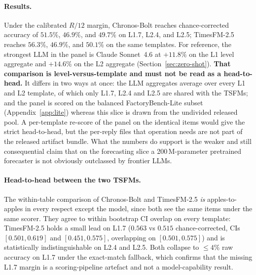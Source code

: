\paragraph{Results.} Under the calibrated $R/12$ margin, Chronos-Bolt reaches chance-corrected accuracy of $51.5\%$, $46.9\%$, and $49.7\%$ on L1.7, L2.4, and L2.5; TimesFM-2.5 reaches $56.3\%$, $46.9\%$, and $50.1\%$ on the same templates. For reference, the strongest LLM in the panel is Claude Sonnet~4.6 at $+11.8\%$ on the L1 level aggregate and $+14.6\%$ on the L2 aggregate (Section~\ref{sec:zero-shot}). \textbf{That comparison is level-versus-template and must not be read as a head-to-head.} It differs in two ways at once: the LLM aggregates average over every L1 and L2 template, of which only L1.7, L2.4 and L2.5 are shared with the TSFMs; and the panel is scored on the balanced FactoryBench-Lite subset (Appendix~\ref{app:lite}) whereas this slice is drawn from the undivided released pool. A per-template re-score of the panel on the identical items would give the strict head-to-head, but the per-reply files that operation needs are not part of the released artifact bundle. What the numbers do support is the weaker and still consequential claim that on the forecasting slice a 200\,M-parameter pretrained forecaster is not obviously outclassed by frontier LLMs.

\paragraph{Head-to-head between the two TSFMs.} The within-table comparison of Chronos-Bolt and TimesFM-2.5 \emph{is} apples-to-apples in every respect except the model, since both see the same items under the same scorer. They agree to within bootstrap CI overlap on every template: TimesFM-2.5 holds a small lead on L1.7 ($0.563$ vs $0.515$ chance-corrected, CIs $[0.501, 0.619]$ and $[0.451, 0.575]$, overlapping on $[0.501, 0.575]$) and is statistically indistinguishable on L2.4 and L2.5. Both collapse to $\le 4\%$ raw accuracy on L1.7 under the exact-match fallback, which confirms that the missing L1.7 margin is a scoring-pipeline artefact and not a model-capability result.

